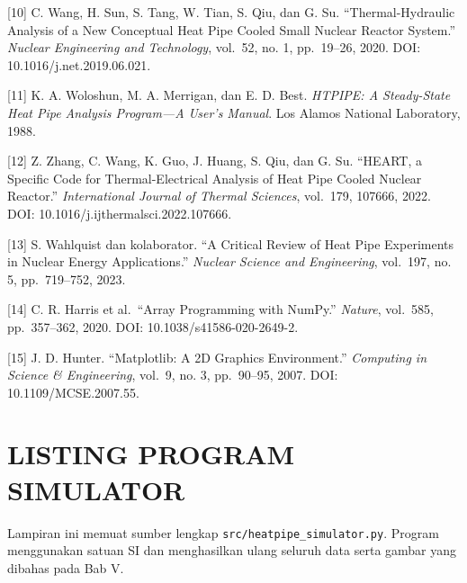 \documentclass[
  12pt,a4paper,oneside]{report}
\begin{document}
{[}10{]} C. Wang, H. Sun, S. Tang, W. Tian, S. Qiu, dan G. Su.
``Thermal-Hydraulic Analysis of a New Conceptual Heat Pipe Cooled Small
Nuclear Reactor System.'' \emph{Nuclear Engineering and Technology},
vol.~52, no. 1, pp.~19--26, 2020. DOI: 10.1016/j.net.2019.06.021.

{[}11{]} K. A. Woloshun, M. A. Merrigan, dan E. D. Best. \emph{HTPIPE: A
Steady-State Heat Pipe Analysis Program---A User's Manual}. Los Alamos
National Laboratory, 1988.

{[}12{]} Z. Zhang, C. Wang, K. Guo, J. Huang, S. Qiu, dan G. Su.
``HEART, a Specific Code for Thermal-Electrical Analysis of Heat Pipe
Cooled Nuclear Reactor.'' \emph{International Journal of Thermal
Sciences}, vol.~179, 107666, 2022. DOI:
10.1016/j.ijthermalsci.2022.107666.

{[}13{]} S. Wahlquist dan kolaborator. ``A Critical Review of Heat Pipe
Experiments in Nuclear Energy Applications.'' \emph{Nuclear Science and
Engineering}, vol.~197, no. 5, pp.~719--752, 2023.

{[}14{]} C. R. Harris et al.~``Array Programming with NumPy.''
\emph{Nature}, vol.~585, pp.~357--362, 2020. DOI:
10.1038/s41586-020-2649-2.

{[}15{]} J. D. Hunter. ``Matplotlib: A 2D Graphics Environment.''
\emph{Computing in Science \& Engineering}, vol.~9, no. 3, pp.~90--95,
2007. DOI: 10.1109/MCSE.2007.55.

\appendix

\hypertarget{listing-program-simulator}{%
\chapter{LISTING PROGRAM SIMULATOR}\label{listing-program-simulator}}

Lampiran ini memuat sumber lengkap \texttt{src/heatpipe\_simulator.py}.
Program menggunakan satuan SI dan menghasilkan ulang seluruh data serta
gambar yang dibahas pada Bab V.
\end{document}
